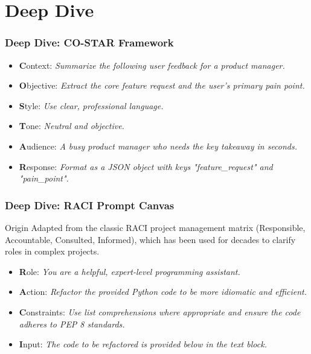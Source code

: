 \documentclass{beamer}
\begin{document}
\section{Deep Dive}

\begin{frame}[fragile]
    \frametitle{Deep Dive: CO-STAR Framework}
    \begin{itemize}
        \item \textbf{C}ontext: \textit{Summarize the following user feedback for a product manager.}
        \item \textbf{O}bjective: \textit{Extract the core feature request and the user's primary pain point.}
        \item \textbf{S}tyle: \textit{Use clear, professional language.}
        \item \textbf{T}one: \textit{Neutral and objective.}
        \item \textbf{A}udience: \textit{A busy product manager who needs the key takeaway in seconds.}
        \item \textbf{R}esponse: \textit{Format as a JSON object with keys "feature\_request" and "pain\_point".}
    \end{itemize}
\end{frame}

\begin{frame}[fragile]
    \frametitle{Deep Dive: RACI Prompt Canvas}
	\begin{block}{Origin}
		Adapted from the classic RACI project management matrix (Responsible, Accountable, Consulted, Informed), which has been used for decades to clarify roles in complex projects.
	\end{block}
    \begin{itemize}
        \item \textbf{R}ole: \textit{You are a helpful, expert-level programming assistant.}
        \item \textbf{A}ction: \textit{Refactor the provided Python code to be more idiomatic and efficient.}
        \item \textbf{C}onstraints: \textit{Use list comprehensions where appropriate and ensure the code adheres to PEP 8 standards.}
        \item \textbf{I}nput: \textit{The code to be refactored is provided below in the text block.}
    \end{itemize}
\end{frame}
\end{document}
